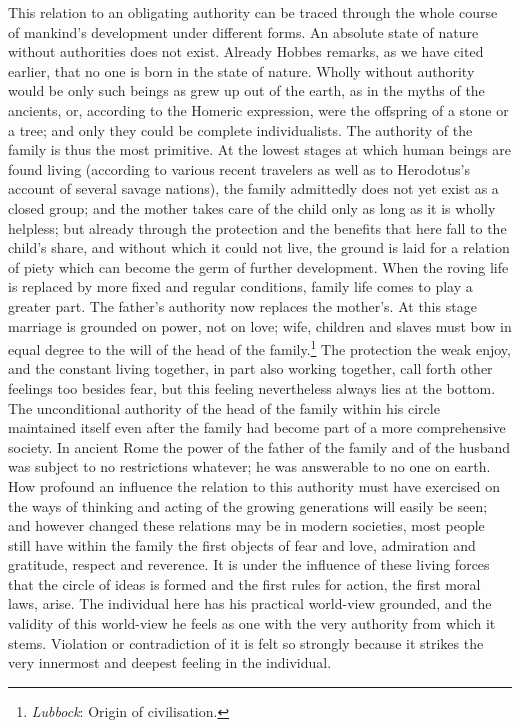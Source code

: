 \documentclass[12pt,a4paper,openany]{book}
\newcommand{\opage}[1]{\marginnote{\footnotesize\textit{[#1]}}}
\begin{document}
This relation to an obligating authority can be traced through the whole
course of mankind's development under different forms. An absolute state of
nature without authorities does not exist. Already Hobbes remarks, as we have
cited earlier, that no one is born in the state of nature. Wholly without
authority would be only such beings as grew up out of the earth, as in the
myths of the ancients, or, according to the Homeric expression, were the
offspring of a stone or a tree; and only they could be complete
individualists. The authority of the family is thus the most primitive. At the
lowest stages at which human beings are found living (according to various
recent travelers as well as to Herodotus's account of several savage nations),
the family admittedly does not yet exist as a closed group; and the mother
takes care of the child only as long as it is wholly helpless; but already
through the protection and the benefits that here fall to the child's share,
and without which it could not live, the ground is laid for a relation of
piety which can become the germ of further development. When the roving life
is replaced by more fixed and regular conditions, family life comes to play a
greater part. The father's authority now replaces the mother's. At this stage
marriage is grounded on power, not on love; wife, children and slaves must bow
in equal degree to the will of the head of the
family.\footnote[1]{\emph{Lubbock}: Origin of civilisation.} \opage{59}The
protection the weak enjoy, and the constant living together, in part also
working together, call forth other feelings too besides fear, but this feeling
nevertheless always lies at the bottom. The unconditional authority of the
head of the family within his circle maintained itself even after the family
had become part of a more comprehensive society. In ancient Rome the power of
the father of the family and of the husband was subject to no restrictions
whatever; he was answerable to no one on earth. How profound an influence the
relation to this authority must have exercised on the ways of thinking and
acting of the growing generations will easily be seen; and however changed
these relations may be in modern societies, most people still have within the
family the first objects of fear and love, admiration and gratitude, respect
and reverence. It is under the influence of these living forces that the
circle of ideas is formed and the first rules for action, the first moral
laws, arise. The individual here has his practical world-view grounded, and
the validity of this world-view he feels as one with the very authority from
which it stems. Violation or contradiction of it is felt so strongly because
it strikes the very innermost and deepest feeling in the individual.
\end{document}
